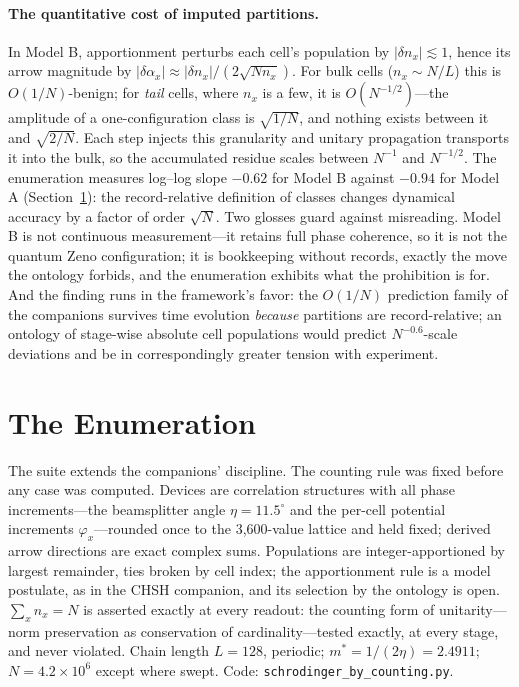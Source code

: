 \documentclass[11pt]{article}
\theoremstyle{definition}
\theoremstyle{remark}
\begin{document}
\paragraph{The quantitative cost of imputed partitions.} In Model B, apportionment perturbs each cell's population by $|\delta n_x| \lesssim 1$, hence its arrow magnitude by $|\delta \alpha_x| \approx |\delta n_x| / (2\sqrt{N n_x})$. For bulk cells ($n_x \sim N/L$) this is $O(1/N)$-benign; for \emph{tail} cells, where $n_x$ is a few, it is $O(N^{-1/2})$---the amplitude of a one-configuration class is $\sqrt{1/N}$, and nothing exists between it and $\sqrt{2/N}$. Each step injects this granularity and unitary propagation transports it into the bulk, so the accumulated residue scales between $N^{-1}$ and $N^{-1/2}$. The enumeration measures log--log slope $-0.62$ for Model B against $-0.94$ for Model A (Section~\ref{sec:enum}): the record-relative definition of classes changes dynamical accuracy by a factor of order $\sqrt{N}$. Two glosses guard against misreading. Model B is not continuous measurement---it retains full phase coherence, so it is not the quantum Zeno configuration; it is bookkeeping without records, exactly the move the ontology forbids, and the enumeration exhibits what the prohibition is for. And the finding runs in the framework's favor: the $O(1/N)$ prediction family of the companions survives time evolution \emph{because} partitions are record-relative; an ontology of stage-wise absolute cell populations would predict $N^{-0.6}$-scale deviations and be in correspondingly greater tension with experiment.

\section{The Enumeration}\label{sec:enum}
The suite extends the companions' discipline. The counting rule was fixed before any case was computed. Devices are correlation structures with all phase increments---the beamsplitter angle $\eta = 11.5^\circ$ and the per-cell potential increments $\varphi_x$---rounded once to the 3,600-value lattice and held fixed; derived arrow directions are exact complex sums. Populations are integer-apportioned by largest remainder, ties broken by cell index; the apportionment rule is a model postulate, as in the CHSH companion, and its selection by the ontology is open. $\sum_x n_x = N$ is asserted exactly at every readout: the counting form of unitarity---norm preservation as conservation of cardinality---tested exactly, at every stage, and never violated. Chain length $L = 128$, periodic; $m^\ast = 1/(2\eta) = 2.4911$; $N = 4.2 \times 10^6$ except where swept. Code: \texttt{schrodinger\_by\_counting.py}.
\end{document}
